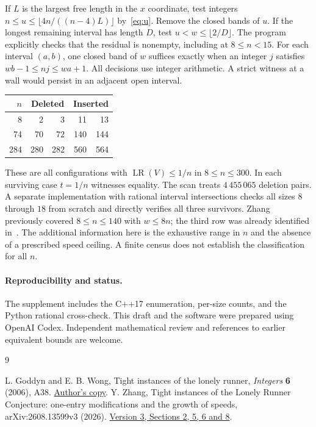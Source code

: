 \documentclass[11pt,a4paper]{article}
\newcommand{\LR}{\operatorname{LR}}
\begin{document}
If $L$ is the largest free length in the $x$ coordinate, test integers
$n\le u\le\lfloor 4n/((n-4)L)\rfloor$ by~\eqref{eq:u}. Remove the
closed bands of $u$. If the longest remaining interval has length $D$,
test $u<w\le\lfloor 2/D\rfloor$. The program explicitly checks that the
residual is nonempty, including at $8\le n<15$. For each interval $(a,b)$,
one closed band of $w$ suffices exactly when an integer $j$ satisfies
$wb-1\le nj\le wa+1$. All decisions use integer arithmetic. A strict
witness at a wall would persist in an adjacent open interval.

\begin{center}
\begin{tabular}{rrrrr}
\toprule $n$&\multicolumn{2}{c}{Deleted}&\multicolumn{2}{c}{Inserted}\\
\midrule
8&2&3&11&13\\74&70&72&140&144\\284&280&282&560&564\\
\bottomrule
\end{tabular}
\end{center}
These are all configurations with $\LR(V)\le1/n$ in $8\le n\le300$.
In each surviving case $t=1/n$ witnesses equality. The scan treats
$4\,455\,065$ deletion pairs. A separate implementation with rational
interval intersections checks all sizes $8$ through $18$ from scratch
and directly verifies all three survivors. Zhang~\cite[Theorem 6.10]{Z}
previously covered $8\le n\le140$ with $w\le8n$; the third row was
already identified in~\cite[Example 5.2]{Z}. The additional information
here is the exhaustive range in $n$ and the absence of a prescribed speed
ceiling. A finite census does not establish the classification for all $n$.

\paragraph{Reproducibility and status.}
The supplement includes the C++17 enumeration, per-size counts, and
the Python rational cross-check. This draft and the software were
prepared using OpenAI Codex. Independent mathematical review and
references to earlier equivalent bounds are welcome.

\begin{thebibliography}{9}\small\raggedright
{} L. Goddyn and E. B. Wong, Tight instances of the lonely runner,
\textit{Integers} \textbf{6} (2006), A38.
\href{https://www.sfu.ca/~goddyn/Papers/063tight_lonely_runner.pdf}{Author's copy}.
 Y. Zhang, Tight instances of the Lonely Runner Conjecture:
one-entry modifications and the growth of speeds, arXiv:2608.13599v3 (2026).
\href{https://arxiv.org/html/2608.13599v3}{Version 3, Sections 2, 5, 6 and 8}.
\end{thebibliography}
\end{document}

